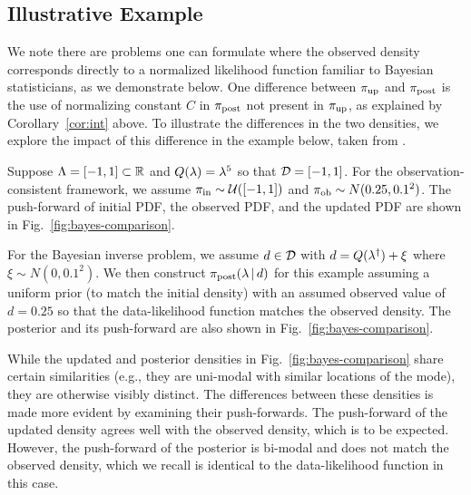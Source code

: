 \subsection{Illustrative Example}
We note there are problems one can formulate where the observed density corresponds directly to a normalized likelihood function familiar to Bayesian statisticians, as we demonstrate below.
One difference between $\operatorname*{\pi_{up}}$ and $\operatorname*{\pi_{post}}$ is the use of normalizing constant $C$ in $\operatorname*{\pi_{post}}$ not present in $\operatorname*{\pi_{up}}$, as explained by Corollary~\ref{cor:int} above.
To illustrate the differences in the two densities, we explore the impact of this difference in the example below, taken from \cite{BJW18}.



\begin{ex}
Suppose ${\Lambda} = [-1,1]\subset\mathbb{R}$ and $Q(\lambda)=\lambda^5$ so that $\mathcal{D} = [-1,1]$.
For the observation-consistent framework, we assume $\operatorname*{\pi_{in}}\sim \mathcal{U}([-1,1])$ and $\operatorname*{\pi_{ob}}\sim N(0.25,0.1^2)$.
The push-forward of initial PDF, the observed PDF, and the updated PDF are shown in Fig.~\ref{fig:bayes-comparison}.

For the Bayesian inverse problem, we assume $d\in \mathcal{D}$ with $d=Q(\lambda^\dagger)+\xi$ where $\xi\sim N(0,0.1^2)$.
We then construct $\pi_{\text{post}}(\lambda \, |\, d)$ for this example assuming a uniform prior (to match the initial density) with an assumed observed value of $d=0.25$ so that the data-likelihood function matches the observed density.
The posterior and its push-forward are also shown in Fig.~\ref{fig:bayes-comparison}.

While the updated and posterior densities in Fig.~\ref{fig:bayes-comparison} share certain similarities (e.g., they are uni-modal with similar locations of the mode), they are otherwise visibly distinct.
The differences between these densities is made more evident by examining their push-forwards.
The push-forward of the updated density agrees well with the observed density, which is to be expected.
However, the push-forward of the posterior is bi-modal and does not match the observed density, which we recall is identical to the data-likelihood function in this case.


\end{ex}
